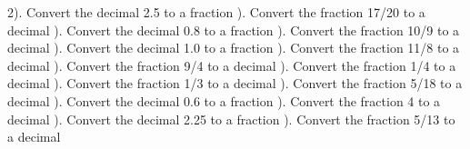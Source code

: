 \documentclass{article}%
\begin{document}
2). Convert the decimal 2.5 to a fraction%
\newline%
\newline%
). Convert the fraction 17/20 to a decimal%
\newline%
\newline%
). Convert the decimal 0.8 to a fraction%
\newline%
\newline%
). Convert the fraction 10/9 to a decimal%
\newline%
\newline%
). Convert the decimal 1.0 to a fraction%
\newline%
\newline%
). Convert the fraction 11/8 to a decimal%
\newline%
\newline%
). Convert the fraction 9/4 to a decimal%
\newline%
\newline%
). Convert the fraction 1/4 to a decimal%
\newline%
\newline%
). Convert the fraction 1/3 to a decimal%
\newline%
\newline%
). Convert the fraction 5/18 to a decimal%
\newline%
\newline%
). Convert the decimal 0.6 to a fraction%
\newline%
\newline%
). Convert the fraction 4 to a decimal%
\newline%
\newline%
). Convert the decimal 2.25 to a fraction%
\newline%
\newline%
). Convert the fraction 5/13 to a decimal%
\newline%
\end{document}
